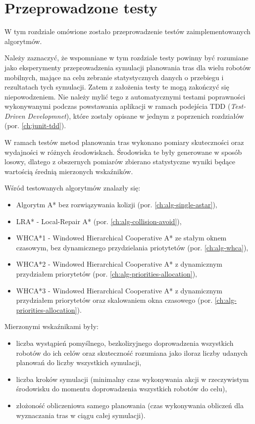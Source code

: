 \chapter{Przeprowadzone testy}
\label{ch:tests}
W tym rozdziale omówione zostało przeprowadzenie testów zaimplementowanych algorytmów.

Należy zaznaczyć, że wspomniane w tym rozdziale testy powinny być rozumiane jako eksperymenty przeprowadzenia symulacji planowania tras dla wielu robotów mobilnych, mające na celu zebranie statystycznych danych o przebiegu i rezultatach tych symulacji. Zatem z założenia testy te mogą zakończyć się niepowodzeniem.
Nie należy mylić tego z automatycznymi testami poprawności wykonywanymi podczas powstawania aplikacji w ramach podejścia TDD ({\it Test-Driven Developmnet}), które zostały opisane w jednym z poprzenich rozdziałów (por. \ref{ch:junit-tdd}).

W ramach testów metod planowania tras wykonano pomiary skuteczności oraz wydajności w różnych środowiskach. 
Środowiska te były generowane w sposób losowy, dlatego z obszernych pomiarów zbierano statystyczne wyniki będące wartością średnią mierzonych wskaźników.

Wśród testowanych algorytmów znalazły się:
\begin{itemize}
	\item Algorytm A* bez rozwiązywania kolizji (por. \ref{ch:alg-single-astar}),
	\item LRA* - Local-Repair A* (por. \ref{ch:alg-collision-avoid}),
	\item WHCA*1 - Windowed Hierarchical Cooperative A* ze stałym oknem czasowym, bez dynamicznego przydzielania priotytetów (por. \ref{ch:alg-whca}),
	\item WHCA*2 - Windowed Hierarchical Cooperative A* z dynamicznym przydziałem priorytetów (por. \ref{ch:alg-priorities-allocation}),
	\item WHCA*3 - Windowed Hierarchical Cooperative A* z dynamicznym przydziałem priorytetów oraz skalowaniem okna czasowego (por. \ref{ch:alg-priorities-allocation}).
\end{itemize}

Mierzonymi wskaźnikami były:
\begin{itemize}
	\item liczba wystąpień pomyślnego, bezkolizyjnego doprowadzenia wszystkich robotów do ich celów oraz skuteczność rozumiana jako iloraz liczby udanych planowań do liczby wszystkich symulacji,
	\item liczba kroków symulacji (minimalny czas wykonywania akcji w rzeczywistym środowisku do momentu doprowadzenia wszystkich robotów do celu),
	\item złożoność obliczeniowa samego planowania (czas wykonywania obliczeń dla wyznaczania tras w ciągu całej symulacji).
\end{itemize}

